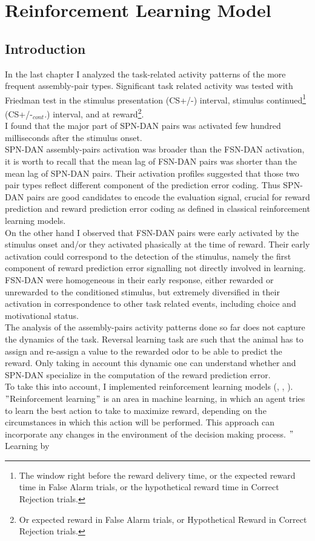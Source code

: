 \chapter{Reinforcement Learning Model}
\label{chap:RLModel}
\section{Introduction}
\label{sec:IntroRL}
In the last chapter I analyzed the task-related activity patterns of the more frequent assembly-pair types. Significant task related activity was tested with Friedman test in the stimulus presentation (CS+/-) interval, stimulus continued\footnote{The window right before the reward delivery time, or the expected reward time in False Alarm trials, or the hypothetical reward time in Correct Rejection trials.} (CS+/-$_{cont}$.) interval, and at reward\footnote{Or expected reward in False Alarm trials, or Hypothetical Reward in Correct Rejection trials.}.\\I found that the major part of SPN-DAN pairs was activated few hundred milliseconds after the stimulus onset.\\SPN-DAN assembly-pairs activation was broader than the FSN-DAN activation, it is worth to recall that the mean lag of FSN-DAN pairs was shorter than the mean lag of SPN-DAN pairs. Their activation profiles suggested that those two pair types reflect different component of the prediction error coding. Thus SPN-DAN pairs are good candidates to encode the evaluation signal, crucial for reward prediction and reward prediction error coding as defined in classical reinforcement learning models.\\On the other hand I observed that FSN-DAN pairs were early activated by the stimulus onset and/or they activated phasically at the time of reward. Their early activation could correspond to the detection of the stimulus, namely the first component of reward prediction error signalling not directly involved in learning.\\FSN-DAN were homogeneous in their early response, either rewarded or unrewarded to the conditioned stimulus, but extremely diversified in their activation in correspondence to other task related events, including choice and motivational status.\\The analysis of the assembly-pairs activity patterns done so far does not capture the dynamics of the task. Reversal learning task are such that the animal has to assign and re-assign a value to the rewarded odor to be able to predict the reward. Only taking in account this dynamic one can understand whether and SPN-DAN specialize in the computation of the reward prediction error.\\To take this into account, I implemented reinforcement learning models (\cite{RescorlaWagner}, \cite{Sutton}, \cite{SuttonBarto}).\\$"$Reinforcement learning$"$ is an area in machine learning, in which an agent tries to learn the best action to take to maximize reward, depending on the circumstances in which this action will be performed. This approach can incorporate any changes in the environment of the decision making process. $"$Learning by 
